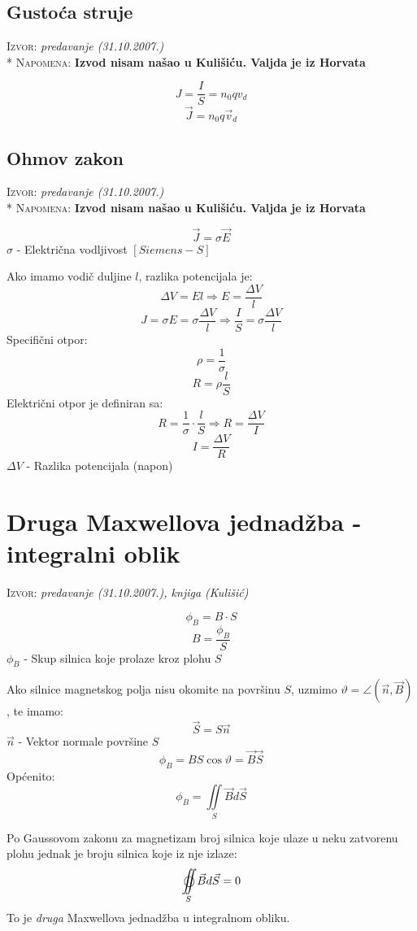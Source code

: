 \documentclass{report}
\begin{document}
\subsection{Gustoća struje}
\small \textsc{Izvor:} \textit{predavanje (31.10.2007.)}\\*
\small \textsc{Napomena:} \textbf{Izvod nisam našao u Kulišiću. Valjda je iz Horvata}

$$J = \frac{I}{S} = n _0 q v _d$$
$$\vec{J} = n _0 q \vec{v} _d$$

\subsection{Ohmov zakon}
\small \textsc{Izvor:} \textit{predavanje (31.10.2007.)}\\*
\small \textsc{Napomena:} \textbf{Izvod nisam našao u Kulišiću. Valjda je iz Horvata}

$$\vec{J} = \sigma \vec{E}$$
$\sigma $ - Električna vodljivost $[Siemens - S]$

Ako imamo vodič duljine $l$, razlika potencijala je:
$$\Delta V = E l \Rightarrow E = \frac{\Delta V}{l}$$
$$J = \sigma E = \sigma \frac{\Delta V}{l} \Rightarrow \frac{I}{S} = \sigma \frac{\Delta V}{l}$$
Specifični otpor:
$$\rho = \frac{1}{\sigma}$$
$$R = \rho \frac{l}{S}$$
Električni otpor je definiran sa:
$$R = \frac{1}{\sigma} \cdot \frac{l}{S} \Rightarrow R = \frac{\Delta V}{I}$$
$$I = \frac{\Delta V}{R}$$
$\Delta V$ - Razlika potencijala (napon)

\section{Druga Maxwellova jednadžba - integralni oblik}
\small \textsc{Izvor:} \textit{predavanje (31.10.2007.), knjiga (Kulišić)}

$$\phi _B = B \cdot S$$
$$B = \frac{\phi _B}{S}$$
$\phi _B$ - Skup silnica koje prolaze kroz plohu $S$

Ako silnice magnetskog polja nisu okomite na površinu $S$, uzmimo $\vartheta = \angle (\vec n, \vec B)$, te imamo:
$$\vec{S} = S \vec{n}$$
$\vec{n}$ - Vektor normale površine $S$
$$\phi _B = BS \cos \vartheta = \vec{B} \vec{S}$$
Općenito:
\begin{equation*} {
	\phi _B = \iint\limits_S {\vec Bd\vec S}
	\tag{$[Wb]$}
}
\end{equation*}

Po Gaussovom zakonu za magnetizam broj silnica koje ulaze u neku zatvorenu plohu jednak je broju silnica koje iz nje izlaze:
$$\mathop{{\int\!\!\!\!\!\int}\mkern-21mu \bigcirc}\limits_S {\vec Bd\vec S}  = 0$$
To je \textit{druga} Maxwellova jednadžba u integralnom obliku.
\end{document}
